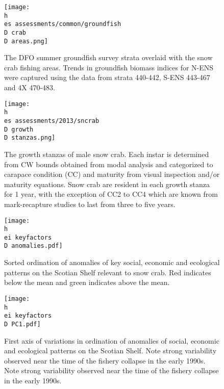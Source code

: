 \documentclass[11pt]{article}
\newcommand{\D}{.}
\newcommand{\h}{/home/hubleyb/}
\newcommand{\es}{bio.data/bio.snowcrab/}
\newcommand{\ei}{bio.data/bio.indicators/}
\begin{document}

\begin{figure}
\centering
\texttt{[image: \\h \\es assessments/common/groundfish\\D crab\\D areas.png]}
\caption{The DFO summer groundfish survey strata overlaid with the snow crab fishing areas. Trends in groundfish biomass indices for N-ENS were captured using the data from strata 440-442, S-ENS 443-467 and 4X 470-483.}
\end{figure}
\clearpage




\begin{figure}
\centering
\texttt{[image: \\h \\es assessments/2013/sncrab\\D growth\\D stanzas.png]}
\caption{The growth stanzas of male snow crab. Each instar is determined from CW bounds obtained from modal analysis and categorized to carapace condition (CC) and maturity from visual inspection and/or maturity equations. Snow crab are resident in each growth stanza for 1 year, with the exception of CC2 to CC4 which are known from mark-recapture studies to last from three to five years.}
\end{figure}
\clearpage

\begin{figure}
\centering
\texttt{[image: \\h \\ei keyfactors\\D anomalies.pdf]}
\caption{Sorted ordination of anomalies of key social, economic and ecological patterns on the Scotian Shelf relevant to snow crab. Red indicates below the mean and green indicates above the mean.}
\end{figure}
\clearpage


\begin{figure}
\centering
\texttt{[image: \\h \\ei keyfactors\\D PC1.pdf]}
\caption{First axis of variations in ordination of anomalies of social, economic and ecological patterns on the Scotian Shelf. Note strong variability observed near the time of the fishery collapse in the early 1990s. Note strong variability observed near the time of the fishery collapse in the early 1990s.}
\end{figure}
\clearpage


\end{document}
